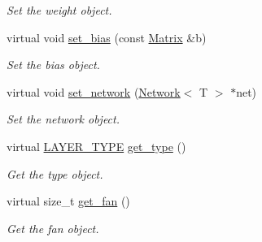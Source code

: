 \begin{DoxyCompactItemize}
\begin{DoxyCompactList}\small\item\em Set the weight object. \end{DoxyCompactList}\item 
virtual void \mbox{\hyperlink{class_layer_a16eecfdfbd98cb94918b7d19ecaeb740}{set\+\_\+bias}} (const \mbox{\hyperlink{class_layer_a22b1e7286096aa62bd245536c8ebdaf1}{Matrix}} \&b)
\begin{DoxyCompactList}\small\item\em Set the bias object. \end{DoxyCompactList}\item 
virtual void \mbox{\hyperlink{class_layer_a6281daa82294d6979eaa59acf0ea8f31}{set\+\_\+network}} (\mbox{\hyperlink{class_network}{Network}}$<$ T $>$ $\ast$net)
\begin{DoxyCompactList}\small\item\em Set the network object. \end{DoxyCompactList}\item 
virtual \mbox{\hyperlink{layer__base_8hpp_a5f7e99058765b058df158c099200b154}{L\+A\+Y\+E\+R\+\_\+\+T\+Y\+PE}} \mbox{\hyperlink{class_layer_a9a59bb1bd6e1880abc71d9afbfb96496}{get\+\_\+type}} ()
\begin{DoxyCompactList}\small\item\em Get the type object. \end{DoxyCompactList}\item 
virtual size\+\_\+t \mbox{\hyperlink{class_layer_a43681206a2ef690667c41423b6b6f20b}{get\+\_\+fan}} ()
\begin{DoxyCompactList}\small\item\em Get the fan object. \end{DoxyCompactList}\end{DoxyCompactItemize}
